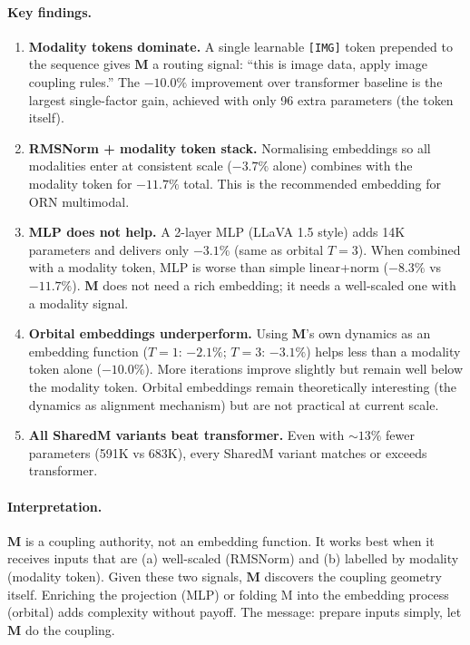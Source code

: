 \documentclass[11pt, a4paper]{article}
\newcommand{\M}{\mathbf{M}}
\theoremstyle{plain}
\theoremstyle{remark}
\begin{document}
\paragraph{Key findings.}
\begin{enumerate}[nosep]
    \item \textbf{Modality tokens dominate.}  A single learnable \texttt{[IMG]} token prepended to the sequence gives $\M$ a routing signal: ``this is image data, apply image coupling rules.''  The $-10.0\%$ improvement over transformer baseline is the largest single-factor gain, achieved with only 96 extra parameters (the token itself).

    \item \textbf{RMSNorm + modality token stack.}  Normalising embeddings so all modalities enter at consistent scale ($-3.7\%$ alone) combines with the modality token for $-11.7\%$ total.  This is the recommended embedding for ORN multimodal.

    \item \textbf{MLP does not help.}  A 2-layer MLP (LLaVA 1.5 style) adds 14K parameters and delivers only $-3.1\%$ (same as orbital $T{=}3$).  When combined with a modality token, MLP is worse than simple linear+norm ($-8.3\%$ vs $-11.7\%$).  $\M$ does not need a rich embedding; it needs a well-scaled one with a modality signal.

    \item \textbf{Orbital embeddings underperform.}  Using $\M$'s own dynamics as an embedding function ($T{=}1$: $-2.1\%$; $T{=}3$: $-3.1\%$) helps less than a modality token alone ($-10.0\%$).  More iterations improve slightly but remain well below the modality token.  Orbital embeddings remain theoretically interesting (the dynamics as alignment mechanism) but are not practical at current scale.

    \item \textbf{All SharedM variants beat transformer.}  Even with ${\sim}13\%$ fewer parameters (591K vs 683K), every SharedM variant matches or exceeds transformer.
\end{enumerate}

\paragraph{Interpretation.}
$\M$ is a coupling authority, not an embedding function.  It works best when it receives inputs that are (a) well-scaled (RMSNorm) and (b) labelled by modality (modality token).  Given these two signals, $\M$ discovers the coupling geometry itself.  Enriching the projection (MLP) or folding M into the embedding process (orbital) adds complexity without payoff.  The message: prepare inputs simply, let $\M$ do the coupling.
\end{document}
